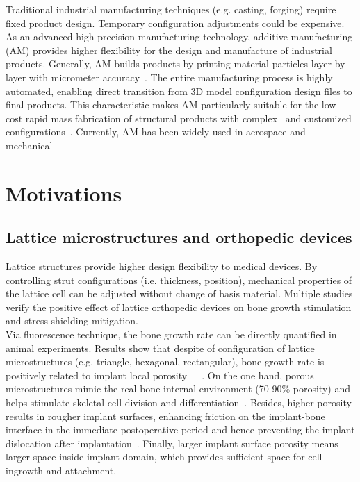\documentclass[12pt]{extbook}
\begin{document}
Traditional industrial manufacturing techniques (e.g. casting, forging) require fixed product design. Temporary configuration adjustments could be expensive. As an advanced high-precision manufacturing technology, additive manufacturing (AM) provides higher flexibility for the design and manufacture of industrial products. Generally, AM builds products by printing material particles layer by layer with micrometer accuracy~\cite{calignano2017overview}. The entire manufacturing process is highly automated, enabling direct transition from 3D model configuration design files to final products. This characteristic makes AM particularly suitable for the low-cost rapid mass fabrication of structural products with complex~\cite{mahmoud2017lattice} and customized configurations~\cite{gupta2015recent}. Currently, AM has been widely used in aerospace and mechanical~\cite{liu2017aerospace}\\

\section{Motivations}
\label{intro_moti}

\subsection{Lattice microstructures and orthopedic devices}

Lattice structures provide higher design flexibility to medical devices. By controlling strut configurations (i.e. thickness, position), mechanical properties of the lattice cell can be adjusted without change of basis material. Multiple studies verify the positive effect of lattice orthopedic devices on bone growth stimulation and stress shielding mitigation.\\

Via fluorescence technique, the bone growth rate can be directly quantified in animal experiments. Results show that despite of configuration of lattice microstructures (e.g. triangle, hexagonal, rectangular), bone growth rate is positively related to implant local porosity~\cite{cheng2014additively}~\cite{van2012effect}~\cite{li2007bone}. On the one hand, porous microstructures mimic the real bone internal environment (70-90\% porosity) and helps stimulate skeletal cell division and differentiation~\cite{balla2010porous}. Besides, higher porosity results in rougher implant surfaces, enhancing friction on the implant-bone interface in the immediate postoperative period and hence preventing the implant dislocation after implantation~\cite{xue2007processing}. Finally, larger implant surface porosity means larger space inside implant domain, which provides sufficient space for cell ingrowth and attachment.\\
\end{document}
